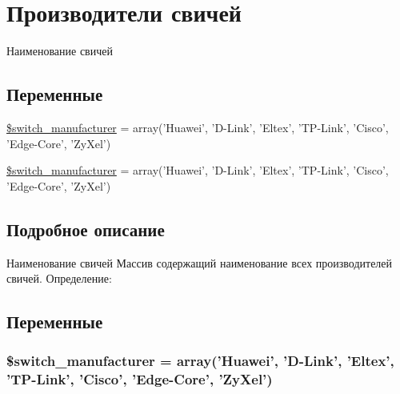 \hypertarget{group__switch__manufacturer}{\section{Производители свичей}
\label{group__switch__manufacturer}
}


Наименование свичей  


\subsection*{Переменные}
\begin{DoxyCompactItemize}
\item 
\hyperlink{group__switch__manufacturer_ga2b1ea6f804c1caa0c3e824412fe37b16}{\$switch\-\_\-manufacturer} = array('Huawei', 'D-\/Link', 'Eltex', 'T\-P-\/Link', 'Cisco', 'Edge-\/Core', 'Zy\-Xel')
\item 
\hyperlink{group__switch__manufacturer_ga2b1ea6f804c1caa0c3e824412fe37b16}{\$switch\-\_\-manufacturer} = array('Huawei', 'D-\/Link', 'Eltex', 'T\-P-\/Link', 'Cisco', 'Edge-\/Core', 'Zy\-Xel')
\end{DoxyCompactItemize}


\subsection{Подробное описание}
Наименование свичей Массив содержащий наименование всех производителей свичей. Определение\-: 
 

\subsection{Переменные}
\hypertarget{group__switch__manufacturer_ga2b1ea6f804c1caa0c3e824412fe37b16}{
\subsubsection[{\$switch\-\_\-manufacturer}]{\setlength{\rightskip}{0pt plus 5cm}\$switch\-\_\-manufacturer = array('Huawei', 'D-\/Link', 'Eltex', 'T\-P-\/Link', 'Cisco', 'Edge-\/Core', 'Zy\-Xel')}}\label{group__switch__manufacturer_ga2b1ea6f804c1caa0c3e824412fe37b16}


